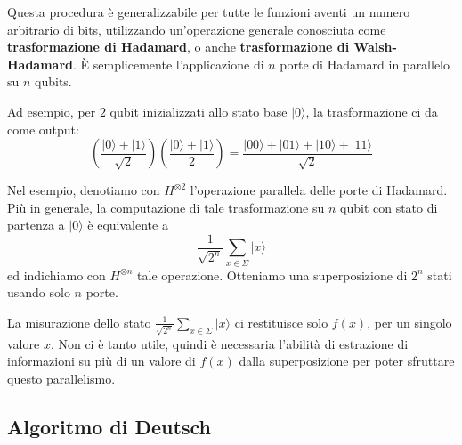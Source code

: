  Questa procedura è generalizzabile per tutte le funzioni aventi
 un numero arbitrario di bits, utilizzando un'operazione
 generale conosciuta come \textbf{trasformazione di Hadamard}, o anche
 \textbf{trasformazione di Walsh-Hadamard}. È semplicemente l'applicazione 
 di $n$ porte di Hadamard in parallelo su $n$ qubits.
 \begin{example}{}{}
    Ad esempio, per $2$ qubit inizializzati allo stato base $|0\rangle$,
    la trasformazione ci da come output:
    \begin{equation*}
        \left(\frac{|0\rangle + |1\rangle}{\sqrt{2}}\right)\left(\frac{|0\rangle + |1\rangle}{2}\right) = \frac{|00\rangle + |01\rangle +|10\rangle +|11\rangle}{\sqrt{2}}
    \end{equation*}
 \end{example}
 Nel esempio, denotiamo con $H^{\otimes 2}$ l'operazione parallela delle porte di Hadamard. Più in generale, 
 la computazione di tale trasformazione su $n$ qubit con stato di partenza a $|0\rangle$ è equivalente a
 \begin{equation*}
    \frac{1}{\sqrt{2^n}}\sum_{x \in \Sigma} |x\rangle
 \end{equation*}
ed indichiamo con $H^{\otimes n}$ tale operazione. Otteniamo una superposizione di
\textbf{$2^n$} stati usando solo \textbf{$n$} porte.

La misurazione dello stato $\frac{1}{\sqrt{2^n}}\sum_{x \in \Sigma} |x\rangle$ ci restituisce solo $f(x)$, per un singolo
valore $x$. Non ci è tanto utile, quindi è necessaria l'abilità di estrazione di informazioni
su più di un valore di $f(x)$ dalla superposizione per poter sfruttare questo parallelismo.

\subsection{Algoritmo di Deutsch}